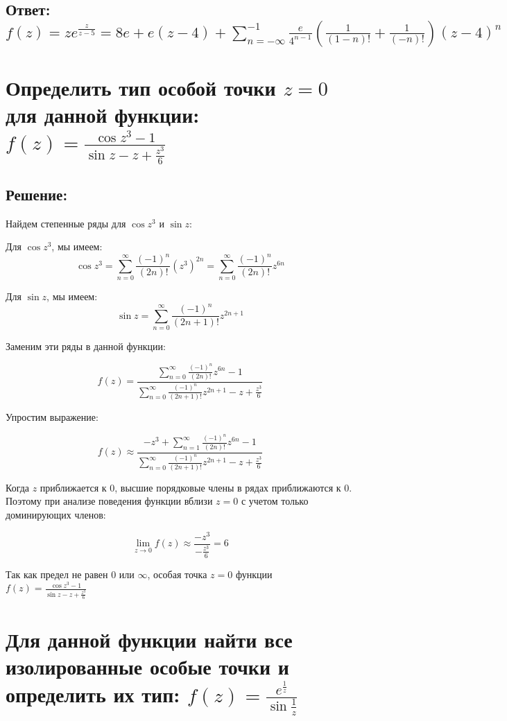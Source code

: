 \documentclass{article}
\begin{document}
	\subsection{Ответ: $f(z)=ze^{\frac{z}{z-5}} = 8e + e(z-4) + \sum\limits_{n=-\infty}^{-1}\frac{e}{4^{n-1}} \left(\frac{1}{(1-n)!} + \frac{1}{(-n)!}\right)(z-4)^n$}

        \section{Определить тип особой точки $z = 0$ для данной функции: $f(z) = \frac{\cos{z^3} - 1}{\sin{z} - z + \frac{z^3}{6}}$}
	\subsection{Решение:}
        Найдем степенные ряды для $\cos{z^3}$ и $\sin{z}$:

        Для $\cos{z^3}$, мы имеем:
        $$\cos{z^3} = \sum\limits_{n=0}^{\infty} \frac{(-1)^n}{(2n)!} (z^3)^{2n} = \sum\limits_{n=0}^{\infty} \frac{(-1)^n}{(2n)!} z^{6n}$$

        Для $\sin{z}$, мы имеем:
        $$\sin{z} = \sum\limits_{n=0}^{\infty} \frac{(-1)^n}{(2n+1)!} z^{2n+1}$$
        
        Заменим эти ряды в данной функции:
        
        $$f(z) = \frac{\sum\limits_{n=0}^{\infty} \frac{(-1)^n}{(2n)!} z^{6n} - 1}{\sum\limits_{n=0}^{\infty} \frac{(-1)^n}{(2n+1)!} z^{2n+1} - z + \frac{z^3}{6}}$$
        
        Упростим выражение:
        
        $$f(z) \approx \frac{-z^3 + \sum\limits_{n=1}^{\infty} \frac{(-1)^n}{(2n)!} z^{6n} - 1}{\sum\limits_{n=0}^{\infty} \frac{(-1)^n}{(2n+1)!} z^{2n+1} - z + \frac{z^3}{6}}$$
        
        Когда $z$ приближается к $0$, высшие порядковые члены в рядах приближаются к $0$. Поэтому при анализе поведения функции вблизи $z=0$ с учетом только доминирующих членов:
        
        $$\lim\limits_{z\rightarrow 0} f(z) \approx \frac{-z^3}{-\frac{z^3}{6}} = 6$$
        
        Так как предел не равен $0$ или $\infty$, особая точка $z=0$ функции $f(z) = \frac{\cos{z^3} - 1}{\sin{z} - z + \frac{z^3}{6}}$

        \section{Для данной функции найти все изолированные особые точки и определить их тип: $f(z) = \frac{e^{\frac{1}{z}}}{\sin{\frac{1}{z}}}$}
\end{document}
